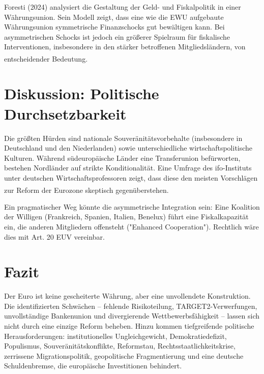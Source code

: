 \documentclass[12pt,a4paper]{article}
\newcommand{\footcite}[1]{\textsuperscript{\cite{#1}}}
\begin{document}
	Foresti (2024) analysiert die Gestaltung der Geld- und Fiskalpolitik in einer Währungsunion. Sein Modell zeigt, dass eine wie die EWU aufgebaute Währungsunion symmetrische Finanzschocks gut bewältigen kann. Bei asymmetrischen Schocks ist jedoch ein größerer Spielraum für fiskalische Interventionen, insbesondere in den stärker betroffenen Mitgliedsländern, von entscheidender Bedeutung.\footcite{Foresti2024}
	
	\section{Diskussion: Politische Durchsetzbarkeit}
	
	Die größten Hürden sind nationale Souveränitätsvorbehalte (insbesondere in Deutschland und den Niederlanden) sowie unterschiedliche wirtschaftspolitische Kulturen. Während südeuropäische Länder eine Transferunion befürworten, bestehen Nordländer auf strikte Konditionalität. Eine Umfrage des ifo-Instituts unter deutschen Wirtschaftsprofessoren zeigt, dass diese den meisten Vorschlägen zur Reform der Eurozone skeptisch gegenüberstehen.\footcite{Ifo2018}
	
	Ein pragmatischer Weg könnte die asymmetrische Integration sein: Eine Koalition der Willigen (Frankreich, Spanien, Italien, Benelux) führt eine Fiskalkapazität ein, die anderen Mitgliedern offensteht ("Enhanced Cooperation"). Rechtlich wäre dies mit Art. 20 EUV vereinbar.
	
	\section{Fazit}
	
	Der Euro ist keine gescheiterte Währung, aber eine unvollendete Konstruktion. Die identifizierten Schwächen – fehlende Risikoteilung, TARGET2-Verwerfungen, unvollständige Bankenunion und divergierende Wettbewerbsfähigkeit – lassen sich nicht durch eine einzige Reform beheben. Hinzu kommen tiefgreifende politische Herausforderungen: institutionelles Ungleichgewicht, Demokratiedefizit, Populismus, Souveränitätskonflikte, Reformstau, Rechtsstaatlichkeitskrise, zerrissene Migrationspolitik, geopolitische Fragmentierung und eine deutsche Schuldenbremse, die europäische Investitionen behindert.
	
\end{document}
